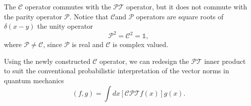 \documentclass[12pt, a4paper]{report}
\newcommand\PT{\(\mathcal{PT}\)}
\newcommand\PP{\(\mathcal{P}\)}
\newcommand\CC{\(\mathcal{C}\)}
\begin{document}
The \CC\: operator commutes with the \PT\: operator, but it does not commute with the parity operator \PP. Notice that \CC\:and \PP\: operators are square roots of $\delta(x-y)$ the unity operator\cite{ComplexExtension}
\begin{equation}\label{eq:1.11}
\mathcal{P}^2 = \mathcal{C}^2 = \mathds{1}, 
\end{equation}
where $\mathcal{P} \neq \mathcal{C}$, since \PP\: is real and \CC\: is complex valued\cite{MustaHbeHermitian}\cite{Bender_2004}.

Using the newly constructed \CC\: operator, we can redesign the \PT\: inner product to suit the conventional probabilistic interpretation of the vector norms in quantum mechanics
\begin{equation}\label{eq:1.12}
\left( f, g \right ) = \int dx \left [ \mathcal{CPT} f(x) \right ] g(x).
\end{equation}
\end{document}
